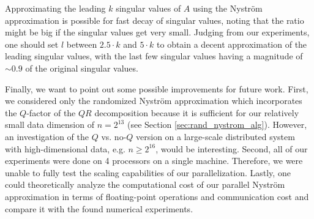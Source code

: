 \documentclass{article}
\theoremstyle{definition}
\begin{document}
Approximating the leading $k$ singular values of $A$ using the Nyström
approximation is possible for fast decay of singular values, noting that the
ratio might be big if the singular values get very small. Judging from our
experiments, one should set $l$ between $2.5\cdot k$ and $5\cdot k$ to obtain a
decent approximation of the leading singular values, with the last few singular
values having a magnitude of $\sim 0.9$ of the original singular values.\newline

Finally, we want to point out some possible improvements for future work. First,
we considered only the randomized Nyström approximation which incorporates the
$Q$-factor of the $QR$ decomposition because it is sufficient for our relatively
small data dimension of $n = 2^{13}$ (see Section \ref{sec:rand_nystrom_alg}).
However, an investigation of the $Q$ vs. no-$Q$ version on a large-scale
distributed system with high-dimensional data, e.g. $n \geq 2^{16}$, would be
interesting. Second, all of our experiments were done on 4 processors on a
single machine. Therefore, we were unable to fully test the scaling capabilities
of our parallelization. Lastly, one could theoretically analyze the
computational cost of our parallel Nyström approximation in terms of
floating-point operations and communication cost and compare it with the found
numerical experiments.
\end{document}
